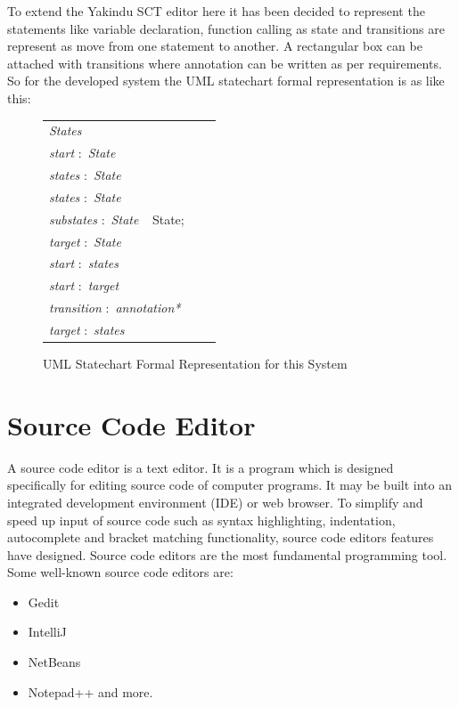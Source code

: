 To extend the Yakindu SCT editor here it has been decided to represent the statements like variable declaration, function calling as state and transitions are represent as move from one statement to another. A rectangular box can be attached with transitions where annotation can be written as per requirements. So for the developed system the UML statechart formal representation is as like this: 
\begin{figure}[ht!]
	\centering
	\begin{tabular}{lll}
	\footnotesize                       
	\textit{States}          \\
	\footnotesize                       
	\textit{start}          
	$:$  \textit{State}\\
	
	\textit{states}          
	$:$  \textit{State}\\
	
	\textit{states}           
	$:$  \textit{State}\\
	\footnotesize
	\textit{substates}            $:$         \textit{State} $\ \  $ {State};       \\   
	\footnotesize
	\textit{target}             $:$         \textit{State}    \\
	\footnotesize                       
	\textit{start}           
	$:$  \textit{states}\\
	\footnotesize                       
	\textit{start}          
	$:$ \textit{target}\\
	\footnotesize                       
	\textit{transition}          
	$:$ \textit{annotation*}\\
	\footnotesize                       
	\textit{target} $:$ \textit{states}        \\ 	
	\end{tabular}
	\caption{UML Statechart Formal Representation for this System}
	\label{statechart_formal_representation_for _this_system}
	\end{figure}
	
\section{Source Code Editor}

A source code editor is a text editor. It is a program which is designed specifically for editing source code of computer programs. It may be built into an integrated development environment (IDE) or web browser. To simplify and speed up input of source code such as syntax highlighting, indentation, autocomplete and bracket matching functionality, source code editors features have designed. Source code editors are the most fundamental programming tool. Some well-known source code editors are:
\begin{itemize}
	\item Gedit 
	\item IntelliJ 
	\item NetBeans
	\item Notepad++ and more.
\end{itemize}

